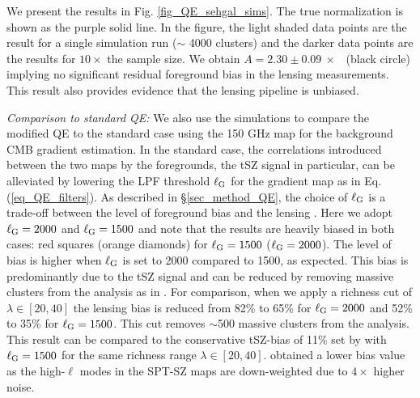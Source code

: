 We present the results in Fig. \ref{fig_QE_sehgal_sims}.
The true normalization is shown as the purple solid line.
In the figure, the light shaded data points are the result for a single simulation run ($\sim$ 4000 clusters) and the darker data points are the results for $10\times$ the sample size. 
We obtain \mbox{$A = 2.30 \pm 0.09\ \times$ \munits} (black circle) implying no significant residual foreground bias in the lensing measurements.
This result also provides evidence that the lensing pipeline is unbiased.

{\it Comparison to standard QE:} We also use the  simulations to compare the modified QE to the standard case using the 150 GHz map for the background CMB gradient estimation.
In the standard case, the correlations introduced between the two maps by the foregrounds, the tSZ signal in particular, can be alleviated by lowering the LPF threshold $\ell_{\rm G}$ for the gradient map as in Eq. (\ref{eq_QE_filters}). 
As described in \S\ref{sec_method_QE}, the choice of $\ell_{\rm G}$ is a trade-off between the level of foreground bias and the lensing \snr{}. 
Here we adopt $\ell_{\rm G} = 2000$ and $\ell_{\rm G} = 1500$ and note that the results are heavily biased in both cases: red squares (orange diamonds) for $\ell_{\rm G} = 1500$ ($\ell_{\rm G} = 2000$).
The level of bias is higher when $\ell_{\rm G}$ is set to 2000 compared to 1500, as expected.
This bias is predominantly due to the tSZ signal and can be reduced by removing massive clusters from the analysis as in . 
For comparison, when we apply a richness cut of $\lambda \in [20, 40]$ the lensing bias is reduced from 82\% to 65\% for $\ell_{\rm G} = 2000$ and 52\% to 35\% for $\ell_{\rm G} = 1500$. 
This cut removes $\sim$500 massive clusters from the analysis.
This result can be compared to the conservative tSZ-bias of 11\% set by  with $\ell_{\rm G} = 1500$ for the same richness range $\lambda \in [20, 40]$.
 obtained a lower bias value as the high-$\ell$ modes in the SPT-SZ maps are down-weighted due to $4\times$ higher noise.


